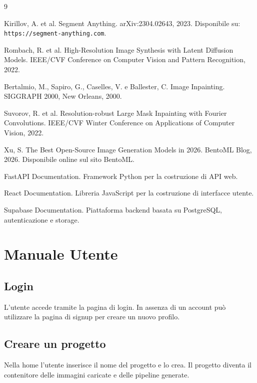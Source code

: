 \documentclass[oneside]{supsistudent}
\begin{document}
\begin{thebibliography}{9}

Kirillov, A. et al. Segment Anything. arXiv:2304.02643, 2023. Disponibile su: \texttt{https://segment-anything.com}.

Rombach, R. et al. High-Resolution Image Synthesis with Latent Diffusion Models. IEEE/CVF Conference on Computer Vision and Pattern Recognition, 2022.

Bertalmio, M., Sapiro, G., Caselles, V. e Ballester, C. Image Inpainting. SIGGRAPH 2000, New Orleans, 2000.

Suvorov, R. et al. Resolution-robust Large Mask Inpainting with Fourier Convolutions. IEEE/CVF Winter Conference on Applications of Computer Vision, 2022.

Xu, S. The Best Open-Source Image Generation Models in 2026. BentoML Blog, 2026. Disponibile online sul sito BentoML.

FastAPI Documentation. Framework Python per la costruzione di API web.

React Documentation. Libreria JavaScript per la costruzione di interfacce utente.

Supabase Documentation. Piattaforma backend basata su PostgreSQL, autenticazione e storage.

\end{thebibliography}



\appendix

\chapter{Manuale Utente}

\section{Login}
L'utente accede tramite la pagina di login. In assenza di un account può utilizzare la pagina di signup per creare un nuovo profilo.

\section{Creare un progetto}
Nella home l'utente inserisce il nome del progetto e lo crea. Il progetto diventa il contenitore delle immagini caricate e delle
pipeline generate.
\end{document}
